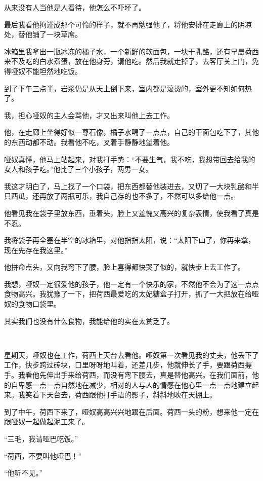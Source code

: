 \par 从来没有人当他是人看待，他怎么不吓坏了。
\par 最后我看他拘谨成那个可怜的样子，就不再勉强他了，将他安排在走廊上的阴凉处，替他铺了一块草席。
\par 冰箱里我拿出一瓶冰冻的橘子水，一个新鲜的软面包，一块干乳酪，还有早晨荷西来不及吃的白水煮蛋，放在他身旁，请他吃。然后我就走掉了，去客厅关上门，免得哑奴不能坦然地吃饭。
\par 到了下午三点半，岩浆仍是从天上倒下来，室内都是滚烫的，室外更不知如何热了。
\par 我，担心哑奴的主人会骂他，才又出来叫他上去工作。
\par 他，在走廊上坐得好似一尊石像，橘子水喝了一点点，自己的干面包吃下了，其他的东西动都不动。我看他不吃，叉着手静静地望着他。
\par 哑奴真懂，他马上站起来，对我打手势：“不要生气，我不吃，我想带回去给我的女人和孩子吃。”他比了三个小孩子，两男一女。
\par 我这才明白了，马上找了一个口袋，把东西都替他装进去，又切了一大块乳酪和半只西瓜，还再放了两瓶可乐，我自己存的也不多了，不然可以多给他一点。
\par 他看见我在袋子里放东西，垂着头，脸上又羞愧又高兴的复杂表情，使我看了真是不忍。
\par 我将袋子再全塞在半空的冰箱里，对他指指太阳，说：“太阳下山了，你再来拿，现在先存在我这里。”
\par 他拼命点头，又向我弯下了腰，脸上喜得都快哭了似的，就快步上去工作了。
\par 我想，哑奴一定很爱他的孩子，他一定有一个快乐的家，不然他不会为了这一点点食物高兴。我犹豫了一下，把荷西最爱吃的太妃糖盒子打开，抓了一大把放在给哑奴的食物口袋里。
\par 其实我们也没有什么食物，我能给他的实在太贫乏了。
\par  
\par 星期天，哑奴也在工作，荷西上天台去看他。哑奴第一次看见我的丈夫，他丢下了工作，快步跨过砖块，口里呀呀地叫着，还差几步，他就伸长了手，要跟荷西握手。我看他先伸出手来给荷西，而没有弯下腰去，真是替他高兴。在我们面前，他的自卑感一点一点自然地在减少，相对的人与人的情感在他心里一点一点地建立起来。我笑着下天台去，荷西跟他打手语的影子，斜斜地映在天棚上。
\par 到了中午，荷西下来了，哑奴高高兴兴地跟在后面。荷西一头的粉，想来他一定在跟哑奴一起做起泥工来了。
\par “三毛，我请哑巴吃饭。”
\par “荷西，不要叫他哑巴！”
\par “他听不见。”
